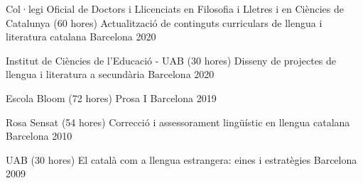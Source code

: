 

\begin{cventries}

  \cventry
    {Col·legi Oficial de Doctors i Llicenciats en Filosofia i Lletres i en Ciències de Catalunya (60 hores)} %
    {Actualització de continguts curriculars de llengua i literatura catalana} %
    {Barcelona} %
    {2020} %
    {
      \begin{cvitems} %
      \end{cvitems}
    }

  \cventry
    {Institut de Ciències de l'Educació - UAB (30 hores)} %
    {Disseny de projectes de llengua i literatura a secundària} %
    {Barcelona} %
    {2020} %
    {
      \begin{cvitems} %
      \end{cvitems}
    }

  \cventry
    {Escola Bloom (72 hores)} %
    {Prosa I} %
    {Barcelona} %
    {2019} %
    {
      \begin{cvitems} %
      \end{cvitems}
    }
    
  \cventry
    {Rosa Sensat (54 hores)} %
    {Correcció i assessorament lingüístic en llengua catalana} %
    {Barcelona} %
    {2010} %
    {
      \begin{cvitems} %
      \end{cvitems}
    } 
    
  \cventry
    {UAB (30 hores)} %
    {El català com a llengua estrangera: eines i estratègies} %
    {Barcelona} %
    {2009} %
    {
      \begin{cvitems} %
      \end{cvitems}
    }    


\end{cventries}
